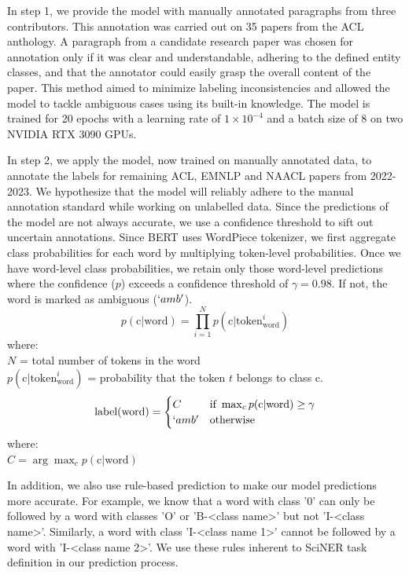 \documentclass[11pt]{article}
\begin{document}
In step 1, we provide the model with manually annotated paragraphs from three contributors. This annotation was carried out on 35 papers from the ACL anthology. A paragraph from a candidate research paper was chosen for annotation only if it was clear and understandable, adhering to the defined entity classes, and that the annotator could easily grasp the overall content of the paper. This method aimed to minimize labeling inconsistencies and allowed the model to tackle ambiguous cases using its built-in knowledge. The model is trained for 20 epochs with a learning rate of $1\times10^{-4}$ and a batch size of 8 on two NVIDIA RTX 3090 GPUs.

In step 2, we apply the model, now trained on manually annotated data, to annotate the labels for remaining ACL, EMNLP and NAACL papers from 2022-2023. We hypothesize that the model will reliably adhere to the manual annotation standard while working on unlabelled data. Since the predictions of the model are not always accurate, we use a confidence threshold to sift out uncertain annotations. Since BERT uses WordPiece tokenizer, we first aggregate class probabilities for each word by multiplying token-level probabilities. Once we have word-level class probabilities, we retain only those word-level predictions where the confidence ($p$) exceeds a confidence threshold of $\gamma = 0.98$. If not, the word is marked as ambiguous ($`amb'$).
\begin{equation}
    p(\text{c}|\text{word}) = \prod_{i = 1}^{N} p(\text{c}|\text{token}_{\text{word}}^i)
\end{equation}
where:\\
$N$ = total number of tokens in the word\\
$p(\text{c}|\text{token}_{\text{word}}^i)$ = probability that the token $t$ belongs to class c.\\

\begin{equation}
\text{label}(\text{word}) =
\begin{cases} 
    C & \text{if } \max_{c} p(\text{c}|\text{word}) \geq \gamma \\
    `amb' & \text{otherwise}
\end{cases}
\end{equation}
where:\\
$C = \arg\max_{c} p(\text{c}|\text{word})$
\newline

In addition, we also use rule-based prediction to make our model predictions more accurate. For example, we know that a word with class '0' can only be followed by a word with classes 'O' or 'B-<class name>' but not 'I-<class name>'. Similarly, a word with class 'I-<class name 1>' cannot be followed by a word with 'I-<class name 2>'. We use these rules inherent to SciNER task definition in our prediction process.
\end{document}
